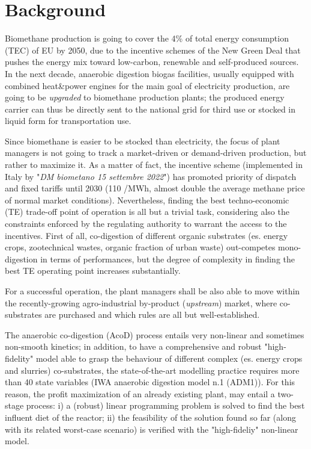 \section{Background}
Biomethane production is going to cover the 4\% of total energy consumption (TEC) of EU by 2050, due to the incentive schemes of the New Green Deal that pushes the energy mix toward low-carbon, renewable and self-produced sources. In the next decade, anaerobic digestion biogas facilities, usually equipped with combined heat\&power engines for the main goal of electricity production, are going to be \emph{upgraded} to biomethane production plants; the produced energy carrier can thus be directly sent to the national grid for third use or stocked in liquid form for transportation use. 

Since biomethane is easier to be stocked than electricity, the focus of plant managers is not going to track a market-driven or demand-driven production, but rather to maximize it. 
As a matter of fact, the incentive scheme (implemented in Italy by "\emph{DM biometano 15 settembre 2022}") has promoted priority of dispatch and fixed tariffs until 2030 (110 \texteuro/MWh, almost double the average methane price of normal market conditions).
Nevertheless, finding the best techno-economic (TE) trade-off point of operation is all but a trivial task, considering also the constraints enforced by the regulating authority to warrant the access to the incentives. 
First of all, co-digestion of different organic substrates (es. energy crops, zootechnical wastes, organic fraction of urban waste) out-competes mono-digestion in terms of performances, but the degree of complexity in finding the best TE operating point increases substantially.

For a successful operation, the plant managers shall be also able to move within the recently-growing agro-industrial by-product (\emph{upstream}) market, where co-substrates are purchased and which rules are all but well-established. 

The anaerobic co-digestion (AcoD) process entails very non-linear and sometimes non-smooth kinetics; in addition, to have a comprehensive and robust "high-fidelity" model able to grasp the behaviour of different complex (es. energy crops and slurries) co-substrates, the state-of-the-art modelling practice requires more than 40 state variables (IWA anaerobic digestion model n.1 (ADM1)).
For this reason, the profit maximization of an already existing plant, may entail a two-stage process: i) a (robust) linear programming problem is solved to find the best influent diet of the reactor; ii) the feasibility of the solution found so far (along with its related worst-case scenario) is verified with the "high-fideliy" non-linear model.

